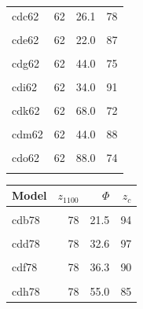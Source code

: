 \documentclass[draft,linenumbers]{agujournal2018}
\begin{document}
\begin{landscape}
\begin{table}
\begin{tabular}[t]{lrrr}
cdc62 & 62 & 26.1 & 78\\
\cellcolor{gray!6}{cdd62} & \cellcolor{gray!6}{62} & \cellcolor{gray!6}{32.6} & \cellcolor{gray!6}{77}\\
cde62 & 62 & 22.0 & 87\\
\addlinespace
\cellcolor{gray!6}{cdf62} & \cellcolor{gray!6}{62} & \cellcolor{gray!6}{36.3} & \cellcolor{gray!6}{82}\\
cdg62 & 62 & 44.0 & 75\\
\cellcolor{gray!6}{cdh62} & \cellcolor{gray!6}{62} & \cellcolor{gray!6}{55.0} & \cellcolor{gray!6}{70}\\
cdi62 & 62 & 34.0 & 91\\
\cellcolor{gray!6}{cdj62} & \cellcolor{gray!6}{62} & \cellcolor{gray!6}{56.1} & \cellcolor{gray!6}{77}\\
\addlinespace
cdk62 & 62 & 68.0 & 72\\
\cellcolor{gray!6}{cdl62} & \cellcolor{gray!6}{62} & \cellcolor{gray!6}{85.0} & \cellcolor{gray!6}{67}\\
cdm62 & 62 & 44.0 & 88\\
\cellcolor{gray!6}{cdn62} & \cellcolor{gray!6}{62} & \cellcolor{gray!6}{72.6} & \cellcolor{gray!6}{77}\\
cdo62 & 62 & 88.0 & 74\\
\addlinespace
\cellcolor{gray!6}{cdp62} & \cellcolor{gray!6}{62} & \cellcolor{gray!6}{110.0} & \cellcolor{gray!6}{75}\\
\bottomrule
\end{tabular}
\centering
\begin{tabular}[t]{lrrr}
\toprule
Model & $z_{1100}$ & $\Phi$ & \vphantom{1} $z_c$\\
\midrule
\cellcolor{gray!6}{cda78} & \cellcolor{gray!6}{78} & \cellcolor{gray!6}{13.0} & \cellcolor{gray!6}{87}\\
cdb78 & 78 & 21.5 & 94\\
\cellcolor{gray!6}{cdc78} & \cellcolor{gray!6}{78} & \cellcolor{gray!6}{26.1} & \cellcolor{gray!6}{97}\\
cdd78 & 78 & 32.6 & 97\\
\cellcolor{gray!6}{cde78} & \cellcolor{gray!6}{78} & \cellcolor{gray!6}{22.0} & \cellcolor{gray!6}{90}\\
\addlinespace
cdf78 & 78 & 36.3 & 90\\
\cellcolor{gray!6}{cdg78} & \cellcolor{gray!6}{78} & \cellcolor{gray!6}{44.0} & \cellcolor{gray!6}{88}\\
cdh78 & 78 & 55.0 & 85\\

\end{tabular}
\end{table}
\end{landscape}
\end{document}
